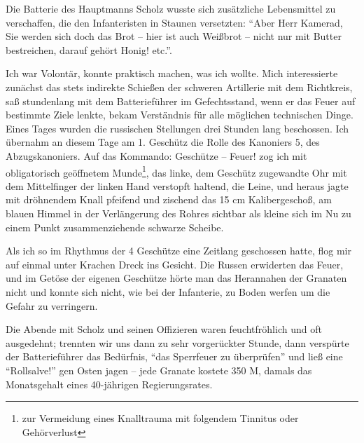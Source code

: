 \documentclass[a5paper,pagesize,10pt,twoside=true]{scrbook}
\begin{document}
Die Batterie des Hauptmanns Scholz wusste sich zusätzliche Lebensmittel zu verschaffen, die den Infanteristen in Staunen versetzten: \enquote{Aber Herr Kamerad, Sie werden sich doch das Brot -- hier ist auch Weißbrot -- nicht nur mit Butter bestreichen, darauf gehört Honig! etc.}.

Ich war Volontär, konnte praktisch machen, was ich wollte. Mich interessierte zunächst das stets indirekte Schießen der schweren Artillerie mit dem Richtkreis, saß stundenlang mit dem Batterieführer im Gefechtsstand, wenn er das Feuer auf bestimmte Ziele lenkte, bekam Verständnis für alle möglichen technischen Dinge. Eines Tages wurden die russischen Stellungen drei Stunden lang beschossen. Ich übernahm an diesem Tage am 1. Geschütz die Rolle des Kanoniers 5, des Abzugskanoniers. Auf das Kommando: Geschütze -- Feuer! zog ich mit obligatorisch geöffnetem Munde\footnote{zur Vermeidung eines Knalltrauma mit folgendem Tinnitus oder Gehörverlust}, das linke, dem Geschütz zugewandte Ohr mit dem Mittelfinger der linken Hand verstopft haltend, die Leine, und heraus jagte mit dröhnendem Knall pfeifend und zischend das 15 cm Kalibergeschoß, am blauen Himmel in der Verlängerung des Rohres sichtbar als kleine sich im Nu zu einem Punkt zusammenziehende schwarze Scheibe.

Als ich so im Rhythmus der 4 Geschütze eine Zeitlang geschossen hatte, flog mir auf einmal unter Krachen Dreck ins Gesicht. Die Russen erwiderten das Feuer, und im Getöse der eigenen Geschütze hörte man das Herannahen der Granaten nicht und konnte sich nicht, wie bei der Infanterie, zu Boden werfen um die Gefahr zu verringern.

Die Abende mit Scholz und seinen Offizieren waren feuchtfröhlich und oft ausgedehnt; trennten wir uns dann zu sehr vorgerückter Stunde, dann verspürte der Batterieführer das Bedürfnis, \enquote{das Sperrfeuer zu überprüfen} und ließ eine \enquote{Rollsalve!} gen Osten jagen -- jede Granate kostete 350 M, damals das Monatsgehalt eines 40-jährigen Regierungsrates.
\end{document}
